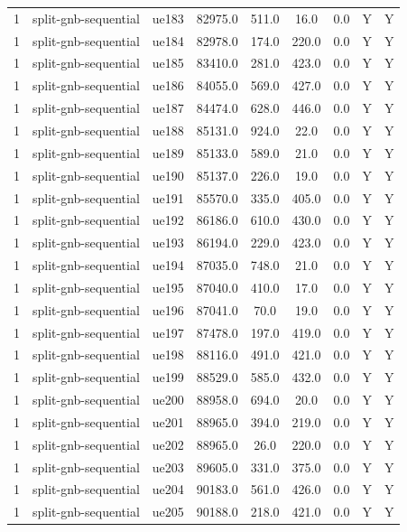\begin{table}[ht]
\begin{tabular}{|c|c|c|c|c|c|c|c|c|}
1 & split-gnb-sequential & ue183 & 82975.0 & 511.0 & 16.0 & 0.0 & Y & Y \\
1 & split-gnb-sequential & ue184 & 82978.0 & 174.0 & 220.0 & 0.0 & Y & Y \\
1 & split-gnb-sequential & ue185 & 83410.0 & 281.0 & 423.0 & 0.0 & Y & Y \\
1 & split-gnb-sequential & ue186 & 84055.0 & 569.0 & 427.0 & 0.0 & Y & Y \\
1 & split-gnb-sequential & ue187 & 84474.0 & 628.0 & 446.0 & 0.0 & Y & Y \\
1 & split-gnb-sequential & ue188 & 85131.0 & 924.0 & 22.0 & 0.0 & Y & Y \\
1 & split-gnb-sequential & ue189 & 85133.0 & 589.0 & 21.0 & 0.0 & Y & Y \\
1 & split-gnb-sequential & ue190 & 85137.0 & 226.0 & 19.0 & 0.0 & Y & Y \\
1 & split-gnb-sequential & ue191 & 85570.0 & 335.0 & 405.0 & 0.0 & Y & Y \\
1 & split-gnb-sequential & ue192 & 86186.0 & 610.0 & 430.0 & 0.0 & Y & Y \\
1 & split-gnb-sequential & ue193 & 86194.0 & 229.0 & 423.0 & 0.0 & Y & Y \\
1 & split-gnb-sequential & ue194 & 87035.0 & 748.0 & 21.0 & 0.0 & Y & Y \\
1 & split-gnb-sequential & ue195 & 87040.0 & 410.0 & 17.0 & 0.0 & Y & Y \\
1 & split-gnb-sequential & ue196 & 87041.0 & 70.0 & 19.0 & 0.0 & Y & Y \\
1 & split-gnb-sequential & ue197 & 87478.0 & 197.0 & 419.0 & 0.0 & Y & Y \\
1 & split-gnb-sequential & ue198 & 88116.0 & 491.0 & 421.0 & 0.0 & Y & Y \\
1 & split-gnb-sequential & ue199 & 88529.0 & 585.0 & 432.0 & 0.0 & Y & Y \\
1 & split-gnb-sequential & ue200 & 88958.0 & 694.0 & 20.0 & 0.0 & Y & Y \\
1 & split-gnb-sequential & ue201 & 88965.0 & 394.0 & 219.0 & 0.0 & Y & Y \\
1 & split-gnb-sequential & ue202 & 88965.0 & 26.0 & 220.0 & 0.0 & Y & Y \\
1 & split-gnb-sequential & ue203 & 89605.0 & 331.0 & 375.0 & 0.0 & Y & Y \\
1 & split-gnb-sequential & ue204 & 90183.0 & 561.0 & 426.0 & 0.0 & Y & Y \\
1 & split-gnb-sequential & ue205 & 90188.0 & 218.0 & 421.0 & 0.0 & Y & Y \\

\end{tabular}
\end{table}
